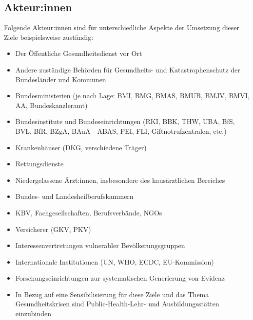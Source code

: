 \documentclass{article}
\begin{document}
\subsection{Akteur:innen}\label{H2657066}



Folgende Akteur:innen sind für unterschiedliche Aspekte der Umsetzung dieser Ziele beispielsweise zuständig: 

\begin{itemize}
\item Der Öffentliche Gesundheitsdienst vor Ort


\item Andere zuständige Behörden für Gesundheits- und Katastrophenschutz der Bundesländer und Kommunen


\item Bundesministerien (je nach Lage: BMI, BMG, BMAS, BMUB, BMJV, BMVI, AA, Bundeskanzleramt)


\item Bundesinstitute und Bundeseinrichtungen (RKI, BBK, THW, UBA, BfS, BVL, BfR, BZgA, BAuA ‐ ABAS, PEI, FLI, Giftnotrufzentralen, etc.)


\item Krankenhäuser (DKG, verschiedene Träger)


\item Rettungsdienste


\item Niedergelassene Ärzt:innen, insbesondere des hausärztlichen Bereiches 


\item Bundes- und Landesheilberufskammern


\item KBV, Fachgesellschaften, Berufsverbände, NGOs 


\item Versicherer (GKV, PKV)


\item Interessenvertretungen vulnerabler Bevölkerungsgruppen


\item Internationale Institutionen (UN, WHO, ECDC, EU-Kommission)


\item Forschungseinrichtungen zur systematischen Generierung von Evidenz


\item In Bezug auf eine Sensibilisierung für diese Ziele und das Thema Gesundheitskrisen sind Public-Health-Lehr- und Ausbildungsstätten einzubinden


\end{itemize}
\end{document}
